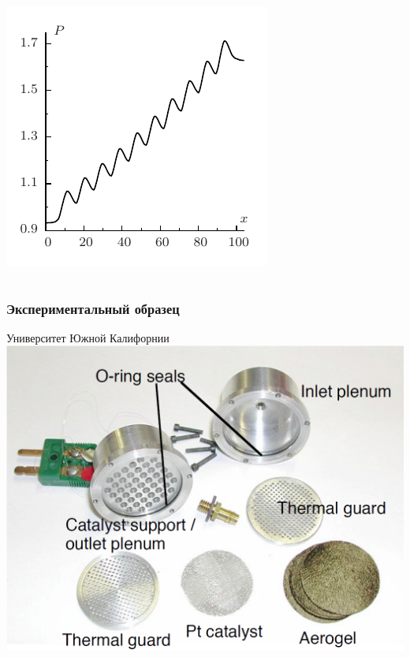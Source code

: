 \documentclass[ucs]{beamer}
\begin{document}
\begin{frame}
\begin{columns}
\begin{center}
			\includegraphics[width=\textwidth]{pics/10kn2x}
		\end{center}
	\end{columns}
\end{frame}

\begin{frame}
	\frametitle{Экспериментальный образец}
	\begin{center}
		Университет Южной Калифорнии\\
		\includegraphics[width=.8\textwidth]{pics/example}
	\end{center}
\end{frame}
\end{document}
